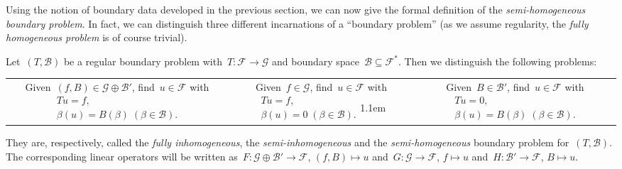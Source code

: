 \documentclass[a4paper]{llncs}
\newcommand{\galg}{\mathcal{F}}
\newcommand{\ogalg}{\mathcal{G}}
\newcommand{\bspc}{\mathcal{B}}
\newcommand{\bvp}[2]{\boxed{\begin{array}{l}#1\\#2\end{array}}}
\begin{document}
Using the notion of boundary data developed in the previous section, we can now
give the formal definition of the \emph{semi-homogeneous boundary problem}. In
fact, we can distinguish three different incarnations of a ``boundary problem''
(as we assume regularity, the \emph{fully homogeneous problem} is of course
trivial).

\begin{mydefinition}
  \label{def:transfer-operator}
  Let~$(T, \bspc)$ be a regular boundary problem with~$T\colon \galg \to \ogalg$
  and boundary space~$\bspc \subseteq \galg^*$. Then we distinguish the
  following problems: \medskip

  \setlength{\tabcolsep}{0pt}\noindent \begin{tabular}{ccc}
    \parbox{0.4\textwidth}{\small
      Given~$(f, B) \in \ogalg \oplus \bspc'$,\\
      find~$u \in \galg$ with\\[1ex]
      $\bvp{Tu = f,}{\beta(u) = B(\beta) \; (\beta \in \bspc).}$}&
    \parbox{0.27\textwidth}{\small
      Given~$f \in \ogalg$,\\
      find~$u \in \galg$ with\\[1ex]
      $\bvp{Tu = f,}{\beta(u) = 0 \; (\beta \in \bspc).}$}\kern1.1em&
    \parbox{0.29\textwidth}{\small
      Given~$B \in \bspc'$,\\
      find~$u \in \galg$ with\\[1ex]
      $\bvp{Tu = 0,}{\beta(u) = B(\beta) \; (\beta \in \bspc).}$}
  \end{tabular}
  \medskip
  
  \noindent They are, respectively, called the \emph{fully inhomogeneous}, the
  \emph{semi-inhomogeneous} and the \emph{semi-homogeneous} boundary problem
  for~$(T, \bspc)$. The corresponding linear operators will be written
  as~$F\colon \ogalg \oplus \bspc' \to \galg$, $(f,B) \mapsto u$ and~$G\colon
  \ogalg \to \galg$, $f \mapsto u$ and~$H\colon \bspc' \to \galg$, $B \mapsto
  u$.
\end{mydefinition}
\end{document}
